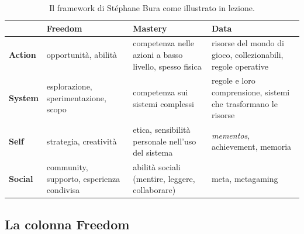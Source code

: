 \begin{table}[htbp]
  \centering
  \small
  \begin{tabular}{@{}p{}p{}p{}p{}@{}}
    \toprule
    & \textbf{Freedom} & \textbf{Mastery} & \textbf{Data} \\
    \midrule
    \textbf{Action} & opportunità, abilità
                    & competenza nelle azioni a basso livello, spesso fisica
                    & risorse del mondo di gioco, collezionabili, regole
                      operative \\
    \addlinespace
    \textbf{System} & esplorazione, sperimentazione, scopo
                    & competenza sui sistemi complessi
                    & regole e loro comprensione, sistemi che trasformano le
                      risorse \\
    \addlinespace
    \textbf{Self}   & strategia, creatività
                    & etica, sensibilità personale nell'uso del sistema
                    & \emph{mementos}, achievement, memoria \\
    \addlinespace
    \textbf{Social} & community, supporto, esperienza condivisa
                    & abilità sociali (mentire, leggere, collaborare)
                    & meta, metagaming \\
    \bottomrule
  \end{tabular}
  \caption{Il framework di Stéphane Bura come illustrato in lezione.}
  \label{tab:bura}
\end{table}

\subsection{La colonna Freedom}



